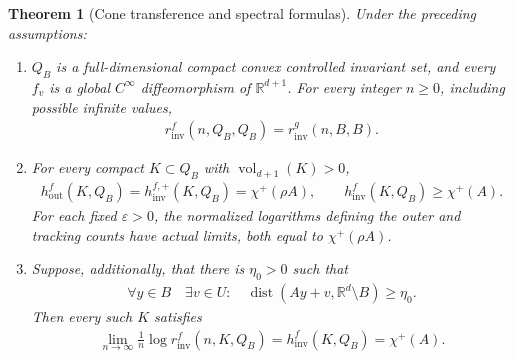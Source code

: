 \documentclass[11pt,a4paper]{article}
\newtheorem{theorem}{Theorem}[section]
\theoremstyle{definition}
\theoremstyle{remark}
\begin{document}
\begin{theorem}[Cone transference and spectral formulas]\label{thm:cone}
Under the preceding assumptions:
\begin{enumerate}
\item \(Q_B\) is a full-dimensional compact convex controlled invariant set, and every \(f_v\) is a global \(C^\infty\) diffeomorphism of \(\mathbb R^{d+1}\). For every integer \(n\geq0\), including possible infinite values,
\begin{align}\label{eq:transference}
 r_{\mathrm{inv}}^{f}(n,Q_B,Q_B)=r_{\mathrm{inv}}^{g}(n,B,B).
\end{align}
\item For every compact \(K\subset Q_B\) with \(\operatorname{vol}_{d+1}(K)>0\),
\begin{align}\label{eq:spectral}
 h_{\mathrm{out}}^{f}(K,Q_B)=h_{\mathrm{inv}}^{f,+}(K,Q_B)=\chi^+(\rho A),
 \qquad
 h_{\mathrm{inv}}^{f}(K,Q_B)\geq\chi^+(A).
\end{align}
For each fixed \(\varepsilon>0\), the normalized logarithms defining the outer and tracking counts have actual limits, both equal to \(\chi^+(\rho A)\).
\item Suppose, additionally, that there is \(\eta_0>0\) such that
\begin{align}\label{eq:margin}
 \forall y\in B\quad\exists v\in U:\quad
 \operatorname{dist}(Ay+v,\mathbb R^d\setminus B)\geq\eta_0.
\end{align}
Then every such \(K\) satisfies
\begin{align}\label{eq:exact-spectral}
 \lim_{n\to\infty}\frac1n\log r_{\mathrm{inv}}^{f}(n,K,Q_B)
       =h_{\mathrm{inv}}^{f}(K,Q_B)=\chi^+(A).
\end{align}
\end{enumerate}
\end{theorem}
\end{document}
